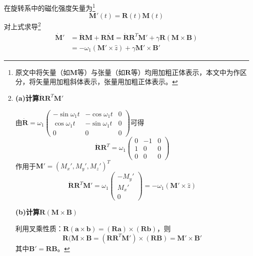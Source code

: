\documentclass[12pt]{article}
\begin{document}
在旋转系中的磁化强度矢量为\footnote{原文中将矢量（如$\bm{M}$等）与张量（如$\mathbf{R}$等）均用加粗正体表示，本文中为作区分，将矢量用加粗斜体表示，张量用加粗正体表示。}
\begin{equation}
    \bm{M}'(t)=\mathbf{R}(t)\bm{M}(t)
    \label{equ:M_rot}
\end{equation}
对上式求导\footnote{\textbf{(a)计算$\dot{\mathbf{R}}\mathbf{R}^T\mathbf{M}'$}

由$\dot{\mathbf{R}}=\omega_1\begin{pmatrix} -\sin\omega_1t & -\cos\omega_1t & 0 \\ \cos\omega_1t & -\sin\omega_1t & 0 \\ 0 & 0 & 0 \end{pmatrix}$可得
\begin{equation}
    \dot{\mathbf{R}}\mathbf{R}^T=\omega_1\begin{pmatrix}
    0 & -1 & 0 \\
    1 & 0 & 0 \\
    0 & 0 & 0 \end{pmatrix}
\end{equation}
作用于$\bm{M}'=(M_x',M_y',M_z')^T$
\begin{equation}
    \dot{\mathbf{R}}\mathbf{R}^T\bm{M}'=\omega_1\begin{pmatrix} -M_y' \\ M_x' \\ 0 \end{pmatrix}=-\omega_1\left(\bm{M}'\times\hat{z}\right)
    \label{equ:key}
\end{equation}

\textbf{(b)计算$\mathbf{R}(\bm{M}\times\bm{B})$}

利用叉乘性质：$\mathbf{R}(\bm{a}\times\bm{b})=(\mathbf{R}\bm{a})\times(\mathbf{R}\bm{b})$，则
\begin{equation}
    \mathbf{R}(\bm{M}\times\bm{B}=(\mathbf{R}\mathbf{R}^T\bm{M}')\times(\mathbf{R}\bm{B})=\bm{M}'\times\bm{B}'
\end{equation}
其中$\bm{B}'=\mathbf{R}\bm{B}$。}
\begin{equation}
    \begin{aligned}
        \dot{\bm{M}}'&=\dot{\mathbf{R}}\bm{M}+\mathbf{R}\dot{\bm{M}}=\dot{\mathbf{R}}\mathbf{R}^T\bm{M}'+\gamma\mathbf{R}(\bm{M}\times\bm{B})\\
        &=-\omega_1(\bm{M}'\times\hat{z})+\gamma\bm{M}'\times\bm{B}'
    \end{aligned}
    \label{equ:Mdot}
\end{equation}
\end{document}
